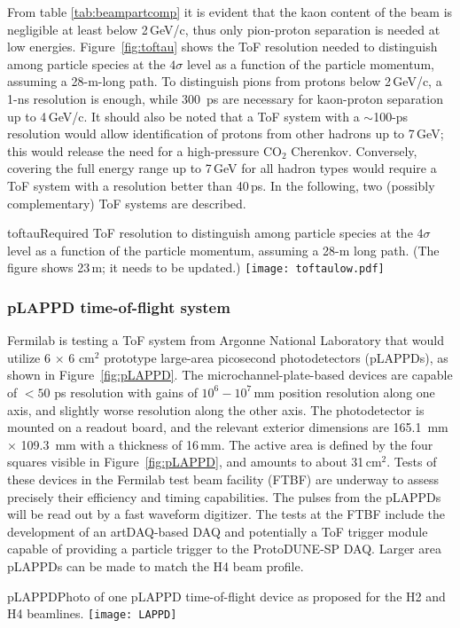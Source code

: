   From table \ref{tab:beampartcomp} it is evident that the kaon content of the beam is negligible at least below 2\,GeV/c, thus  only pion-proton separation is needed at low energies. Figure~\ref{fig:toftau} shows the ToF resolution needed to distinguish among particle species at the $4\sigma$ level as a function of the particle momentum, assuming a 28-m-long path. To distinguish pions from protons below 2\,GeV/c, a 1-ns resolution is enough, while 300~ps are necessary for kaon-proton separation up to  4\,GeV/c. It should also be noted that a ToF system with a $\sim$100-ps resolution would allow identification of protons from other hadrons up to 7\,GeV; this would release the need for a %
  high-pressure CO$_2$ Cherenkov. %
  Conversely, covering %
  the full energy range up to 7\,GeV for all hadron  types would require a ToF system with a resolution better than 40\,ps. %
In the following, two (possibly complementary) ToF systems are described.
\begin{cdrfigure}{toftau}{Required ToF resolution to  distinguish among particle species at the $4\sigma$ level as a function of the particle momentum, assuming a 28-m long path. (The figure shows 23\,m; it needs to be updated.) }
\texttt{[image: toftaulow.pdf]}
\end{cdrfigure}

\subsubsection{pLAPPD time-of-flight system}
Fermilab is testing a ToF system from Argonne National Laboratory that would utilize  
6 $\times$ 6 cm$^2$ prototype
large-area picosecond photodetectors (pLAPPDs), as shown in Figure~\ref{fig:pLAPPD}.
 The microchannel-plate-based devices
are capable of $<50$ ps resolution with gains of $10^6-10^7$\,mm 
position resolution along one axis, and slightly worse resolution
along the other axis.  The photodetector is mounted on a readout
board, and the relevant exterior dimensions are 165.1~mm $\times$ 109.3~mm with a
thickness of 16\,mm. The active area is defined by the four squares visible in Figure~\ref{fig:pLAPPD}, and amounts to about 31\,cm$^2$. Tests of these devices in the Fermilab test beam facility (FTBF) are underway to assess precisely their efficiency and timing capabilities. %
The pulses from the pLAPPDs will be read out by a fast waveform digitizer. The tests at the FTBF include the development of an artDAQ-based DAQ and potentially a ToF trigger module capable of providing a particle trigger to the ProtoDUNE-SP DAQ.
Larger area pLAPPDs can be made to match the H4 beam profile.
\begin{cdrfigure}{pLAPPD}{Photo of one pLAPPD  time-of-flight device as proposed for the H2 and H4 beamlines.}
\texttt{[image: LAPPD]}
\end{cdrfigure}

